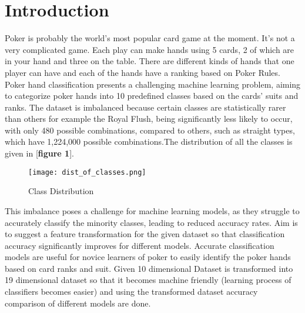 \documentclass[11pt, oneside]{article}   	%
\begin{document}
\section{Introduction}
 Poker is probably the world’s most popular card game at the moment. It’s not a very complicated game. Each play can make hands using 5 cards, 2 of which are in your hand and three on the table. There are different kinds of hands that one player can have and each of the hands have a ranking based on Poker Rules. Poker hand classification presents a challenging machine learning problem, aiming to categorize poker hands into 10 predefined classes based on the cards’ suits and ranks. The dataset is imbalanced because certain classes are statistically rarer than others for example the Royal Flush, being significantly less likely to occur, with only 480 possible combinations, compared to others, such as straight types, which have 1,224,000 possible combinations.The distribution of all the classes is given in [\textbf{figure 1}].
  \begin{figure}[h]
  \centering
  \texttt{[image: dist\_of\_classes.png]}
  \caption{Class Distribution}
  \label{fig:example}
\end{figure}
 This imbalance poses a challenge for machine learning models, as they struggle to accurately classify the minority classes, leading to reduced accuracy rates.
 Aim is to suggest a feature transformation for the given dataset so that classification accuracy significantly improves for different models. Accurate classification models are useful for novice learners of poker to easily identify the poker hands based on card ranks and suit.
Given 10 dimensional Dataset is transformed into 19 dimensional dataset so that it becomes machine friendly (learning process of classifiers becomes easier) and using the transformed dataset accuracy comparison of different models are done.
\end{document}
